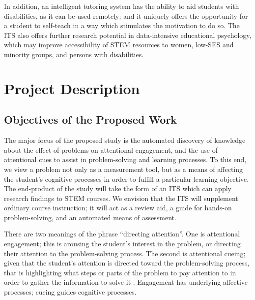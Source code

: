 \documentclass[hidelinks,11pt]{article}
\begin{document}
In addition, an intelligent tutoring system has the ability to aid students
with disabilities, as it can be used remotely; and it uniquely offers the
opportunity for a student to self-teach in a way which stimulates the
motivation to do so.  The ITS also offers further research potential in
data-intensive educational psychology, which may improve accessibility of STEM
resources to women, low-SES and minority groups, and persons with disabilities.


\pagebreak
\section{ Project Description }

\subsection{ Objectives of the Proposed Work }

The major focus of the proposed study is the automated discovery of knowledge
about the effect of problems on attentional engagement, and the use of
attentional cues to assist in problem-solving and learning processes.  To this
end, we view a problem not only as a measurement tool, but as a means of
affecting the student's cognitive processes in order to fulfill a particular
learning objective. The end-product of the study will take the form of an ITS
which can apply research findings to STEM courses.  We envision that the ITS
will supplement ordinary course instruction; it will act as a review aid, a
guide for hands-on problem-solving, and an automated means of assessment.

There are two meanings of the phrase ``directing attention''. One is attentional
engagement; this is arousing the student's interest in the problem, or
directing their attention to the problem-solving process. The second is
attentional cueing; given that the student's attention is directed toward the
problem-solving process, that is highlighting what steps or parts of the
problem to pay attention to in order to gather the information to solve it
{\citep{rouinfar2014}}.  Engagement has underlying affective processes; cueing guides
cognitive processes. 
\end{document}
